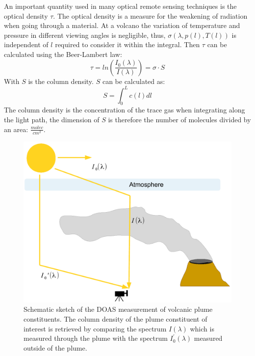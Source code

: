 \documentclass  [
  paper    = a4,
  BCOR     = 10mm,
  twoside,
  fontsize = 12pt,
  fleqn,
  toc      = bibnumbered,
  toc      = listofnumbered,
  numbers  = noendperiod,
  headings = normal,
  listof   = leveldown,
  version  = 3.03
]                                       {scrreprt}
\begin{document}
	An important quantity used in many optical remote sensing techniques is the optical density $\tau$. The optical density is a measure for the weakening of radiation when going through a material. At a volcano the variation of temperature and pressure in different viewing angles is negligible, thus, $\sigma\left(\lambda,p(l),T(l)\right)$ is independent of $l$ required to consider it within the integral. Then  $\tau$ can be calculated using the Beer-Lambert law:
	\begin{equation}
	\tau = ln\left(\frac{I_{0}\left(\lambda\right)}{I\left(\lambda\right)}\right) = \sigma\cdot S
	\end{equation}
	With $S$ is the column density. $S$ can be calculated as:
	\begin{equation}
	S = \int_{0}^{L}c\left(l\right)dl
	\end{equation}
	The column density is the concentration of the trace gas when integrating along the light path, the dimension of $S$ is therefore the number of molecules divided by an area: $\frac{molec}{cm^2}$.\\
	\begin{figure}
		\centering
		\includegraphics[width=0.7\linewidth]{Bilder/DOASFunction}
		\caption{Schematic sketch of the DOAS measurement of volcanic plume constituents. The column density of the plume constituent of interest is retrieved by comparing the spectrum $I\left(\lambda \right)$ which is measured through the plume with the spectrum  $I_0^{'}\left(\lambda \right)$ measured outside of the plume.}
		\label{fig:doasfunction}
	\end{figure}
	
\end{document}
